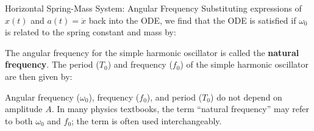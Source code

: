 \documentclass[12pt,compress,aspectratio=169]{beamer}
\begin{document}
\begin{frame}{Horizontal Spring-Mass System: Angular Frequency}
  Substituting expressions of $x(t)$ and $a(t)=\ddot x$ back into the ODE, we
  find that the ODE is satisfied if $\omega_0$ is related to the spring
  constant and mass by:


  The angular frequency for the simple harmonic oscillator is called the
  \textbf{natural frequency}. The period ($T_0$) and frequency ($f_0$) of the
  simple harmonic oscillator are then given by:

  
  Angular frequency ($\omega_0$), frequency ($f_0$), and period ($T_0$) do not
  depend on amplitude $A$. In many physics textbooks, the term ``natural
  frequency'' may refer to both $\omega_0$ and $f_0$; the term is often used
  interchangeably.
\end{frame}
\end{document}

